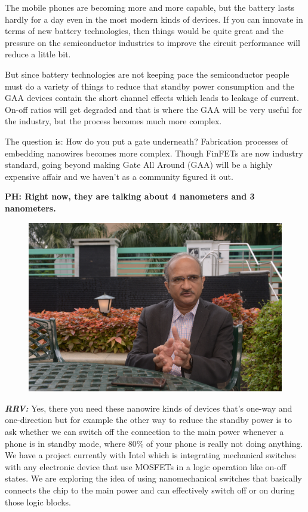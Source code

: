 \begin{multicols}{2}
 The mobile phones are becoming more and more capable, but the battery lasts hardly for a day even in the most modern kinds of devices. If you can innovate in terms of new battery technologies, then things would be quite great and the pressure on the semiconductor industries to improve the circuit performance will reduce a little bit.
 
 But since battery technologies are not keeping pace the semiconductor people must do a variety of things to reduce that standby power consumption and the GAA devices contain the short channel effects which leads to leakage of current. On-off ratios will get degraded and that is where the GAA will be very useful for the industry, but the process becomes much more complex.
 
 The question is: How do you put a gate underneath? Fabrication processes of embedding nanowires becomes more complex. Though FinFETs are now industry standard, going beyond making Gate All Around (GAA) will be a highly expensive affair and we haven’t as a community figured it out.
 
\textbf{PH: Right now, they are talking about 4 nanometers and 3 nanometers.}

\begin{figure}[H]
\centering
\includegraphics[scale=.59]{src/Figures/interview/interview-fig11.jpg}
\end{figure}

\textbf{\textit{RRV:}} Yes, there you need these nanowire kinds of devices that’s one-way and one-direction but for example the other way to reduce the standby power is to ask whether we can switch off the connection to the main power whenever a phone is in standby mode, where 80\% of your phone is really not doing anything. We have a project currently with Intel which is integrating mechanical switches with any electronic device that use MOSFETs in a logic operation like on-off states. We are exploring the idea of using nanomechanical switches that basically connects the chip to the main power and can effectively switch off or on during those logic blocks.


\end{multicols}
